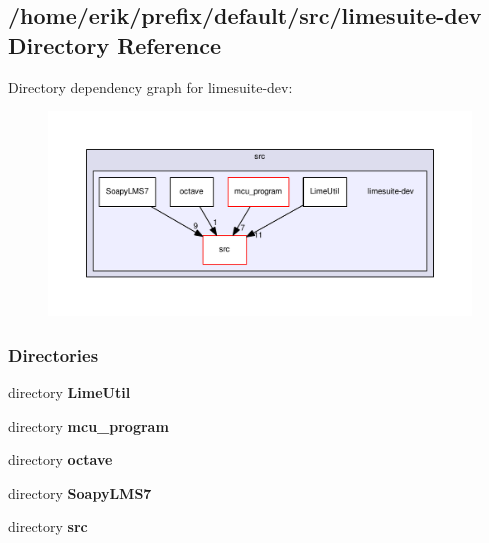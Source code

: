 \subsection{/home/erik/prefix/default/src/limesuite-\/dev Directory Reference}
\label{dir_b9105e5b97f4b271c74f586b556aeb2c}
Directory dependency graph for limesuite-\/dev\+:
\nopagebreak
\begin{figure}[H]
\begin{center}
\leavevmode
\includegraphics[width=350pt]{dir_b9105e5b97f4b271c74f586b556aeb2c_dep}
\end{center}
\end{figure}
\subsubsection*{Directories}
\begin{DoxyCompactItemize}
\item 
directory {\bf Lime\+Util}
\item 
directory {\bf mcu\+\_\+program}
\item 
directory {\bf octave}
\item 
directory {\bf Soapy\+L\+M\+S7}
\item 
directory {\bf src}
\end{DoxyCompactItemize}

